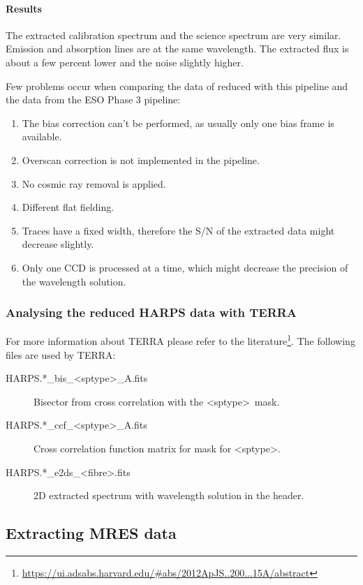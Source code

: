 \documentclass[10pt,a4paper]{article}
\begin{document}
\paragraph{Results}
The extracted calibration spectrum and the science spectrum are very similar. Emission and absorption lines are at the same wavelength. The extracted flux is about a few percent lower and the noise slightly higher.

Few problems occur when comparing the data of reduced with this pipeline and the data from the ESO Phase 3 pipeline:
\begin{enumerate}\setlength\itemsep{0em}
  \item The bias correction can't be performed, as usually only one bias frame is available.
  \item Overscan correction is not implemented in the pipeline.
  \item No cosmic ray removal is applied.
  \item Different flat fielding.
  \item Traces have a fixed width, therefore the S/N of the extracted data might decrease slightly.
  \item Only one CCD is processed at a time, which might decrease the precision of the wavelength solution.
\end{enumerate}

\subsubsection{Analysing the reduced HARPS data with TERRA}
For more information about TERRA please refer to the literature\footnote{\url{https://ui.adsabs.harvard.edu/\#abs/2012ApJS..200...15A/abstract}}. The following files are used by TERRA:
\begin{description}
  \item[HARPS.*\_bis\_\textless sptype\textgreater\_A.fits] Bisector from cross correlation with the \textless sptype\textgreater\ mask.
  \item[HARPS.*\_ccf\_\textless sptype\textgreater\_A.fits] Cross correlation function matrix for mask for \textless sptype\textgreater.
  \item[HARPS.*\_e2ds\_\textless fibre\textgreater.fits] 2D extracted spectrum with wavelength solution in the header.
\end{description}

\subsection{Extracting MRES data}
\end{document}
